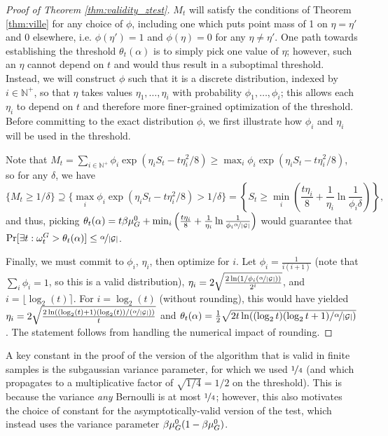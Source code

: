 \begin{proof}[Proof of Theorem \ref{thm:validity_ztest}]
$M_t$ will satisfy the conditions of Theorem \ref{thm:ville} for any choice of $\phi$, including one which puts point mass of 1 on $\eta = \eta'$ and 0 elsewhere, i.e. $\phi(\eta') = 1$ and $\phi(\eta) = 0$ for any $\eta \neq \eta'$. One path towards establishing the threshold $\theta_t(\alpha)$ is to simply pick one value of $\eta$; however, such an $\eta$ cannot depend on $t$ and would thus result in a suboptimal threshold. 
Instead, we will construct $\phi$ such that it is a discrete distribution, indexed by $i \in \mathbb{N}^+$, so that $\eta$ takes values $\eta_1, \dots, \eta_i$ with probability $\phi_1, \dots, \phi_i$; this allows each $\eta_i$ to depend on $t$ and therefore more finer-grained optimization of the threshold. Before committing to the exact distribution $\phi$, we first illustrate how $\phi_i$ and $\eta_i$ will be used in the threshold. 

Note that $M_t = \sum_{i \in \mathbb{N}^+} \phi_i\exp(\eta_iS_t - t\eta_i^2/8) \geq \max_i  \phi_i\exp(\eta_iS_t - t\eta_i^2/8)$, so for any $\delta$, we have 
\[
\{M_t \geq 1/\delta\} \supseteq  \{\max_i  \phi_i\exp(\eta_iS_t - t\eta_i^2/8) > 1/\delta \} = \left\{S_t \geq \min_i \left(\frac{t \eta_i}{8} + \frac{1}{\eta_i}\ln \frac{1}{\phi_i\delta}\right)\right\}, 
\]
and thus, picking $\theta_t(\alpha) = t \beta{\mu_G^0} + \min_i \left(\frac{t \eta_i}{8} + \frac{1}{\eta_i}\ln \frac{1}{\phi_i{\nicefrac{\alpha}{|{\mathcal{G}}|}}}\right)$ would guarantee that $\Pr[\exists t: \omega_t^G >  \theta_t(\alpha)] \leq {\nicefrac{\alpha}{|{\mathcal{G}}|}}$. 

Finally, we must commit to $\phi_i$, $\eta_i$, then optimize for $i$. Let $\phi_i = \frac{1}{i(i+1)}$ (note that $\sum_i \phi_i = 1$, so this is a valid distribution), $\eta_i = 2\sqrt{\frac{2\ln(1/\phi_i({\nicefrac{\alpha}{|{\mathcal{G}}|}}))}{2^i } }$, and $i = \lfloor \log_2(t) \rceil$. For $i = \log_2(t)$ (without rounding), this would have yielded $\eta_i = 2 \sqrt{\frac{2 \ln((\log_2(t) + 1)(\log_2(t))/({\nicefrac{\alpha}{|{\mathcal{G}}|}}))}{t}}$ and $\theta_t(\alpha) = \frac12\sqrt{2t \ln((\log_2t)(\log_2t + 1)/{\nicefrac{\alpha}{|{\mathcal{G}}|}})}$. 
The statement follows from handling the numerical impact of rounding. 
\end{proof}
\begin{remark}
    A key constant in the proof of the version of the algorithm that is valid in finite samples is the subgaussian variance parameter, for which we used $\nicefrac14$ (and which propagates to a multiplicative factor of $\sqrt{1/4} = 1/2$ on the threshold). This is because the variance \textit{any} Bernoulli is at most $\nicefrac14$; however, this also motivates the choice of constant for the asymptotically-valid version of the test, which instead uses the variance parameter $\beta{\mu_G^0}(1-\beta{\mu_G^0})$. 
\end{remark}

